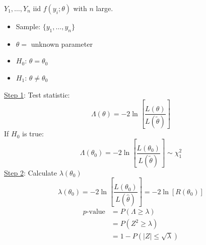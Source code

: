 $ Y_1,\ldots ,Y_n $ iid $ f(y_i;\theta) $ with $ n $ large.
\begin{itemize}
    \item Sample: $ \{y_1,\ldots ,y_n\} $
    \item $ \theta= $ unknown parameter
    \item $ H_0 $: $ \theta=\theta_0 $
    \item $ H_1 $: $ \theta\neq\theta_0 $
\end{itemize}
\underline{Step 1}: Test statistic:
\[ \Lambda(\theta)=-2\ln\left[ \frac{L(\theta)}{L(\tilde{\theta})}  \right] \]
If $ H_0 $ is true:
\[ \Lambda(\theta_0)=-2\ln\left[ \frac{L(\theta_0)}{L(\tilde{\theta})}  \right]
    \sim \chi^2_{1} \]
\underline{Step 2}: Calculate $ \lambda(\theta_0) $
\[ \lambda(\theta_0)=-2\ln\left[ \frac{L(\theta_0)}{L(\hat{\theta})}  \right]=-2\ln
    \left[ R(\theta_0) \right] \]
\begin{align*}
    p\text{-value}
     & =P(\Lambda\geqslant \lambda)      \\
     & =P(Z^2\geqslant \lambda)          \\
     & =1-P(|Z|\leqslant \sqrt{\lambda})
\end{align*}

